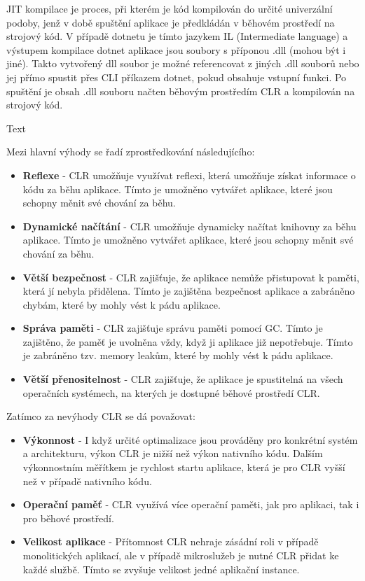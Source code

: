 JIT kompilace je proces, při kterém je kód kompilován do určité univerzální podoby, jenž v době spuštění aplikace je předkládán v běhovém prostředí na strojový kód. V případě dotnetu je tímto jazykem IL (Intermediate language) a výstupem kompilace dotnet aplikace jsou soubory s příponou .dll (mohou být i jiné). Takto vytvořený dll soubor je možné referencovat z jiných .dll souborů nebo jej přímo spustit přes CLI příkazem dotnet, pokud obsahuje vstupní funkci. Po spuštění je obsah .dll souboru načten běhovým prostředím CLR a kompilován na strojový kód.\cite{jit}

Text



Mezi hlavní výhody se řadí zprostředkování následujícího:
\begin{itemize}
    \item  \textbf{Reflexe} - CLR umožňuje využívat reflexi, která umožňuje získat informace o kódu za běhu aplikace. Tímto je umožněno vytvářet aplikace, které jsou schopny měnit své chování za běhu.
    \item \textbf{Dynamické načítání} - CLR umožňuje dynamicky načítat knihovny za běhu aplikace. Tímto je umožněno vytvářet aplikace, které jsou schopny měnit své chování za běhu.
    \item \textbf{Větší bezpečnost} - CLR zajišťuje, že aplikace nemůže přistupovat k paměti, která jí nebyla přidělena. Tímto je zajištěna bezpečnost aplikace a zabráněno chybám, které by mohly vést k pádu aplikace.
    \item \textbf{Správa paměti} - CLR zajišťuje správu paměti pomocí GC. Tímto je zajištěno, že paměť je uvolněna vždy, když ji aplikace již nepotřebuje. Tímto je zabráněno tzv. memory leakům, které by mohly vést k pádu aplikace.
    \item \textbf{Větší přenositelnost} - CLR zajišťuje, že aplikace je spustitelná na všech operačních systémech, na kterých je dostupné běhové prostředí CLR.
\end{itemize}

Zatímco za nevýhody CLR se dá považovat:
\begin{itemize}
    \item  \textbf{Výkonnost} - I když určité optimalizace jsou prováděny pro konkrétní systém a architekturu, výkon CLR je nižší než výkon nativního kódu. Dalším výkonnostním měřítkem je rychlost startu aplikace, která je pro CLR vyšší než v případě nativního kódu.
    \item \textbf{Operační paměť} - CLR využívá více operační paměti, jak pro aplikaci, tak i pro běhové prostředí.
    \item \textbf{Velikost aplikace} - Přítomnost CLR nehraje zásádní roli v případě monolitických aplikací, ale v případě mikroslužeb je nutné CLR přidat ke každé službě. Tímto se zvyšuje velikost jedné aplikační instance.
\end{itemize}

